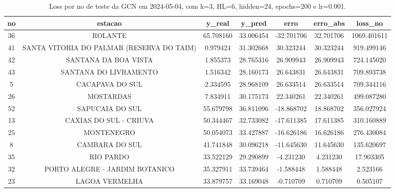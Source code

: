 \begin{table}[h]
\centering
\caption{Loss por no de teste da GCN em 2024-05-04, com k=3, HL=6, hidden=24, epochs=200 e lr=0.001.}
\label{tab:gcn_loss_k3_hl6_h24_e200_d20240504}
\begin{tabular}{ccccccc}
\toprule
no & estacao & y\_real & y\_pred & erro & erro\_abs & loss\_no \\
\midrule
36 & ROLANTE & 65.708160 & 33.006454 & -32.701706 & 32.701706 & 1069.401611 \\
41 & SANTA VITORIA DO PALMAR (RESERVA DO TAIM) & 0.979424 & 31.302668 & 30.323244 & 30.323244 & 919.499146 \\
42 & SANTANA DA BOA VISTA & 1.855373 & 28.765316 & 26.909943 & 26.909943 & 724.145020 \\
43 & SANTANA DO LIVRAMENTO & 1.516342 & 28.160173 & 26.643831 & 26.643831 & 709.893738 \\
5 & CACAPAVA DO SUL & 2.334595 & 28.968109 & 26.633514 & 26.633514 & 709.344116 \\
26 & MOSTARDAS & 7.834911 & 30.175173 & 22.340261 & 22.340261 & 499.087280 \\
52 & SAPUCAIA DO SUL & 55.679798 & 36.811096 & -18.868702 & 18.868702 & 356.027924 \\
13 & CAXIAS DO SUL - CRIUVA & 50.344467 & 32.733082 & -17.611385 & 17.611385 & 310.160889 \\
25 & MONTENEGRO & 50.054073 & 33.427887 & -16.626186 & 16.626186 & 276.430084 \\
8 & CAMBARA DO SUL & 41.741848 & 30.096218 & -11.645630 & 11.645630 & 135.620697 \\
35 & RIO PARDO & 33.522129 & 29.290899 & -4.231230 & 4.231230 & 17.903305 \\
32 & PORTO ALEGRE - JARDIM BOTANICO & 35.327911 & 33.739464 & -1.588448 & 1.588448 & 2.523166 \\
23 & LAGOA VERMELHA & 33.879757 & 33.169048 & -0.710709 & 0.710709 & 0.505107 \\
\bottomrule
\end{tabular}
\end{table}
